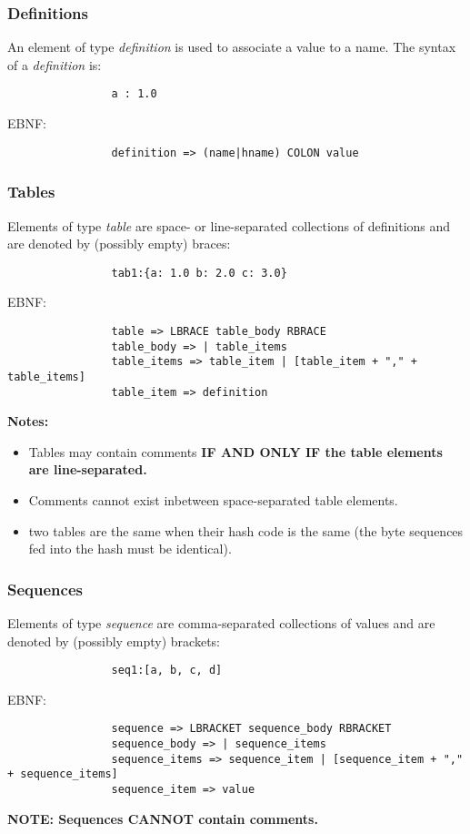 \documentclass{memarticle}
\begin{document}
		\subsubsection{Definitions}
			An element of type \emph{definition} is used to associate a value to a name.
			The syntax of a \emph{definition} is:
			\begin{verbatim}
				a : 1.0
			\end{verbatim}
			\vspace{1mm}
			\par
			EBNF:
			\begin{verbatim}
				definition => (name|hname) COLON value
			\end{verbatim}	
		\subsubsection{Tables}
			Elements of type \emph{table} 
			are space- or line-separated collections of definitions 
			and are denoted by (possibly empty) braces:
			\begin{verbatim}
				tab1:{a: 1.0 b: 2.0 c: 3.0}
			\end{verbatim}
			\vspace{1mm}
			EBNF:
			\begin{verbatim}
				table => LBRACE table_body RBRACE
				table_body => | table_items
				table_items => table_item | [table_item + "," + table_items]
				table_item => definition
			\end{verbatim}
			\par
			\bf Notes:\rm
			\begin{itemize}
				\item Tables may contain comments \bf IF AND ONLY IF \rm 
						the table elements are line-separated. 
				\item Comments cannot exist inbetween space-separated table elements.
				\item two tables are the same when their hash code is the same 
						(the byte sequences fed into the hash must be identical).
			\end{itemize}
		\subsubsection{Sequences}
			Elements of type \emph{sequence} 
			are comma-separated collections of values 
			and are denoted by (possibly empty) brackets:
			\begin{verbatim}
				seq1:[a, b, c, d]
			\end{verbatim}
			\vspace{1mm}
			EBNF:
			\begin{verbatim}
				sequence => LBRACKET sequence_body RBRACKET
				sequence_body => | sequence_items
				sequence_items => sequence_item | [sequence_item + "," + sequence_items]
				sequence_item => value
			\end{verbatim}
			\par
			\bf NOTE: \rm Sequences \bf CANNOT \rm contain comments.
\end{document}

